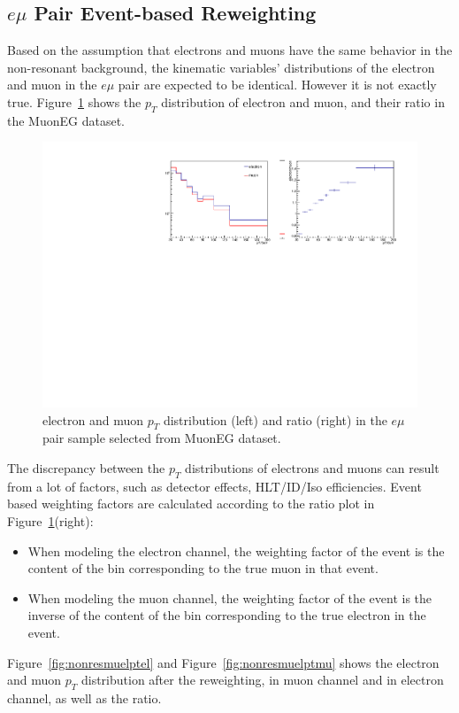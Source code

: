 \subsection{$e\mu$ Pair Event-based Reweighting}
Based on the assumption that electrons and muons have the same behavior in the non-resonant background, the kinematic variables' distributions of the electron and muon in the $e\mu$ pair are expected to be identical. However it is not exactly true. Figure~\ref{fig:nonresmuelpt} shows the $p_T$ distribution of electron and muon, and their ratio in the MuonEG dataset.

\begin{figure}[htbp]
\begin{center}
\includegraphics[width=0.95\linewidth]{figures/nonresmuelpt.pdf}
\caption{electron and muon $p_T$ distribution (left) and ratio (right) in the $e\mu$ pair sample selected from MuonEG dataset.}
\label{fig:nonresmuelpt}
\end{center}
\end{figure}

\vspace{0.3cm}
The discrepancy between the $p_T$ distributions of electrons and muons can result from a lot of factors, such as detector effects, HLT/ID/Iso efficiencies. Event based weighting factors are calculated according to the ratio plot in Figure~\ref{fig:nonresmuelpt}(right):
\begin{itemize}
\item  When modeling the electron channel, the weighting factor of the event is the content of the bin corresponding to the true muon in that event. 
\item  When modeling the muon channel, the weighting factor of the event is the inverse of the content of the bin corresponding to the true electron in the event. 
\end{itemize}
Figure~\ref{fig:nonresmuelptel} and Figure~\ref{fig:nonresmuelptmu} shows the electron and muon $p_T$ distribution after the reweighting, in muon channel and in electron channel, as well as the ratio.

